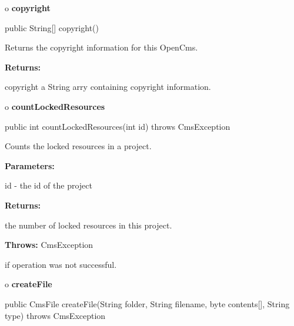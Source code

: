 o {\bf copyright} 

\begin{PRE}
 public String[] copyright()
\end{PRE}

\begin{description}
\htmlDD Returns the copyright information for this OpenCms. 

\begin{description}
\item {\bf Returns:}  

copyright a String arry containing copyright information.  
\end{description}

\end{description}

o {\bf countLockedResources} 

\begin{PRE}
 public int countLockedResources(int id) throws CmsException
\end{PRE}

\begin{description}
\htmlDD Counts the locked resources in a project. 

\begin{description}
\item {\bf Parameters:}  

id - the id of the project  
\item {\bf Returns:}  

the number of locked resources in this project.  
\item {\bf Throws:} CmsException  

if operation was not successful.  
\end{description}

\end{description}

o {\bf createFile} 

\begin{PRE}
 public CmsFile createFile(String folder,
                           String filename,
                           byte contents[],
                           String type) throws CmsException
\end{PRE}

